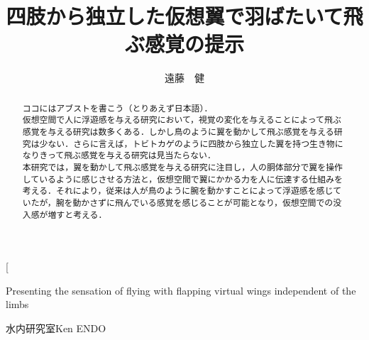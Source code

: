 
\usepackage{jtygm}
\usepackage{ikuo}
\newcommand{\FIGDIR}{./fig}	%

\twocolumn[%
\title{四肢から独立した仮想翼で羽ばたいて飛ぶ感覚の提示}{Presenting the sensation of flying with flapping virtual wings independent of the limbs}
\author{遠藤　健}{水内研究室}{Ken ENDO}

\begin{abstract}
ココにはアブストを書こう（とりあえず日本語）．\\
仮想空間で人に浮遊感を与える研究において，視覚の変化を与えることによって飛ぶ感覚を与える研究は数多くある．しかし鳥のように翼を動かして飛ぶ感覚を与える研究は少ない．さらに言えば，トビトカゲのように四肢から独立した翼を持つ生き物になりきって飛ぶ感覚を与える研究は見当たらない．\\
    
本研究では，翼を動かして飛ぶ感覚を与える研究に注目し，人の胴体部分で翼を操作しているように感じさせる方法と，仮想空間で翼にかかる力を人に伝達する仕組みを考える．それにより，従来は人が鳥のように腕を動かすことによって浮遊感を感じていたが，腕を動かさずに飛んでいる感覚を感じることが可能となり，仮想空間での没入感が増すと考える．
\end{abstract}

